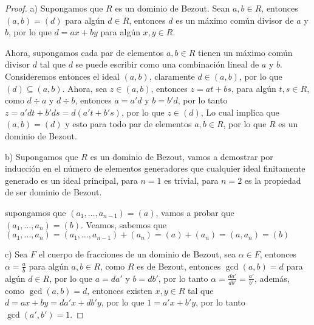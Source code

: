\begin{problem}[7]
\end{problem}

\begin{proof}
    \item[a)] Supongamos que $R$ es un dominio de Bezout. Sean $a,b \in R$, entonces $(a,b) = (d)$ para algún $ d \in R $, entonces $d$ es un máximo común divisor de $a$ y $b$, por lo que $d = ax + by$ para algún $x,y \in R$.
    
    Ahora, supongamos cada par de elementos $a,b \in R$ tienen un máximo común divisor $d$ tal que $d$ se puede escribir como una combinación lineal de $a$ y $b$. Consideremos entonces el ideal $(a,b)$, claramente $d \in (a,b)$, por lo que $ (d) \subseteq (a,b) $. Ahora, sea $z \in (a,b)$, entonces $z = at + bs$, para algún $t,s \in R$, como $d \div a$ y $d \div b$, entonces $a = a'd$ y $b = b'd$, por lo tanto $z = a'dt + b'ds = d(a't + b's)$, por lo que $z \in (d)$, Lo cual implica que $(a,b) = (d)$ y esto para todo par de elementos $a,b \in R$, por lo que $R$ es un dominio de Bezout.

    \item[b)] Supongamos que $R$ es un dominio de Bezout, vamos a demostrar por inducción en el número de elementos generadores que cualquier ideal finitamente generado es un ideal principal, para $n=1$ es trivial, para $n=2$ es la propiedad de ser dominio de Bezout.
    
    supongamos que $(a_1, \ldots, a_{n-1}) = (a)$, vamos a probar que $(a_1, \ldots, a_n) = (b)$. Veamos, sabemos que $(a_1, \ldots, a_n) = (a_1, \ldots, a_{n-1}) + (a_n) = (a) + (a_n) = (a, a_n) = (b) $

    \item[c)] Sea $F$ el cuerpo de fracciones de un dominio de Bezout, sea $\alpha \in F$, entonces $\alpha = \frac{a}{b}$ para algún $a, b \in R$, como $R$ es de Bezout, entonces $\gcd(a,b) = d$ para algún $d \in R$, por lo que $a = da'$ y $b = db'$, por lo tanto $\alpha = \frac{da'}{db'} = \frac{a'}{b'}$, además, como $\gcd(a,b) = d$, entonces existen $x,y \in R$ tal que $d = ax + by = da'x + db'y$, por lo que $1 = a'x + b'y$, por lo tanto $\gcd(a',b') = 1$. 
\end{proof}